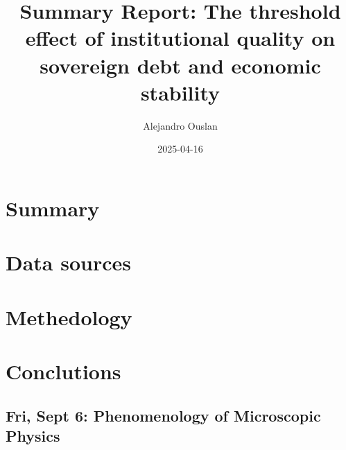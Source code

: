 \documentclass[10pt, oneside]{article}
\title{Summary Report: The threshold effect of institutional quality on sovereign debt and economic stability}
\author{Alejandro Ouslan}
\date{2025-04-16}
\begin{document}
\maketitle
\tableofcontents

\vspace{.25in}

\section{Summary}

\section{Data sources}

\section{Methedology}

\section{Conclutions}

\cite{chowdhury2024threshold}
\subsection{Fri, Sept 6: Phenomenology of Microscopic Physics}
\printbibliography
\end{document}
